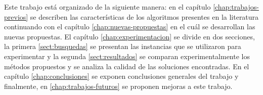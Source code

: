 Este trabajo está organizado de la siguiente manera: en el capítulo \autoref{chap:trabajos-previos} se describen las características de los algoritmos presentes en la literatura continuando con el capítulo \autoref{chap:nuevas-propuestas} en el cuál se desarrollan las nuevas propuestas. El capítulo \autoref{chap:experimentacion} se divide en dos secciones, la primera \autoref{sect:busquedas} se presentan las instancias que se utilizaron para experimentar y la segunda \autoref{sect:resultados} se comparan experimentalmente los métodos propuestos y se analiza la calidad de las soluciones encontradas. En el capítulo  \autoref{chap:conclusiones} se exponen conclusiones generales del trabajo y finalmente, en \autoref{chap:trabajos-futuros} se proponen mejoras a este trabajo.
